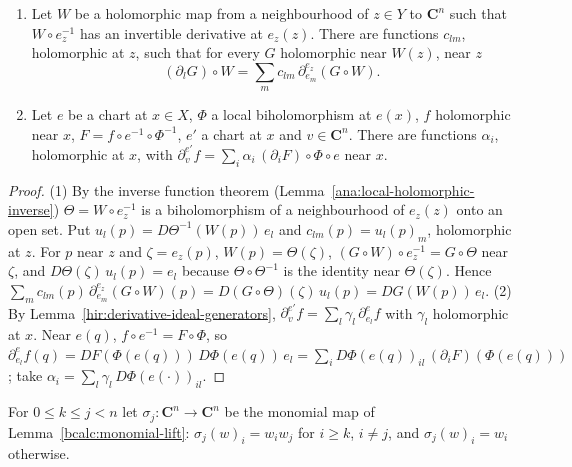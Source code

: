 \begin{lemma}
\label{mc:coordinate-derivatives}
\leanok
\begin{enumerate}
\item Let \(W\) be a holomorphic map from a neighbourhood of \(z\in Y\) to \(\mathbf C^n\) such that \(W\circ e_z^{-1}\) has an invertible
derivative at \(e_z(z)\). There are functions \(c_{lm}\), holomorphic at \(z\), such that for every \(G\) holomorphic near \(W(z)\), near \(z\)
\[
 (\partial_lG)\circ W=\sum_mc_{lm}\,\partial^{e_z}_{e_m}(G\circ W).
\]
\item Let \(e\) be a chart at \(x\in X\), \(\Phi\) a local biholomorphism at \(e(x)\), \(f\) holomorphic near \(x\), \(F=f\circ e^{-1}\circ\Phi^{-1}\),
\(e'\) a chart at \(x\) and \(v\in\mathbf C^n\). There are functions \(\alpha_i\), holomorphic at \(x\), with
\(\partial^{e'}_vf=\sum_i\alpha_i\,(\partial_iF)\circ\Phi\circ e\) near \(x\).
\end{enumerate}
\end{lemma}
\begin{proof}
\leanok
(1) By the inverse function theorem (Lemma~\ref{ana:local-holomorphic-inverse}) \(\Theta=W\circ e_z^{-1}\) is a biholomorphism of a
neighbourhood of \(e_z(z)\) onto an open set. Put \(u_l(p)=D\Theta^{-1}(W(p))\,e_l\) and \(c_{lm}(p)=u_l(p)_m\), holomorphic at \(z\). For \(p\) near
\(z\) and \(\zeta=e_z(p)\), \(W(p)=\Theta(\zeta)\), \((G\circ W)\circ e_z^{-1}=G\circ\Theta\) near \(\zeta\), and \(D\Theta(\zeta)\,u_l(p)=e_l\) because
\(\Theta\circ\Theta^{-1}\) is the identity near \(\Theta(\zeta)\). Hence
\(\sum_mc_{lm}(p)\,\partial^{e_z}_{e_m}(G\circ W)(p)=D(G\circ\Theta)(\zeta)\,u_l(p)=DG(W(p))\,e_l\).
(2) By Lemma~\ref{hir:derivative-ideal-generators}, \(\partial^{e'}_vf=\sum_l\gamma_l\,\partial^e_{e_l}f\) with \(\gamma_l\) holomorphic at \(x\). Near
\(e(q)\), \(f\circ e^{-1}=F\circ\Phi\), so \(\partial^e_{e_l}f(q)=DF(\Phi(e(q)))\,D\Phi(e(q))\,e_l=\sum_iD\Phi(e(q))_{il}\,(\partial_iF)(\Phi(e(q)))\); take
\(\alpha_i=\sum_l\gamma_l\,D\Phi(e(\cdot))_{il}\).
\end{proof}

For \(0\le k\le j<n\) let \(\sigma_j\colon\mathbf C^n\to\mathbf C^n\) be the monomial map of Lemma~\ref{bcalc:monomial-lift}:
\(\sigma_j(w)_i=w_iw_j\) for \(i\ge k\), \(i\ne j\), and \(\sigma_j(w)_i=w_i\) otherwise.

